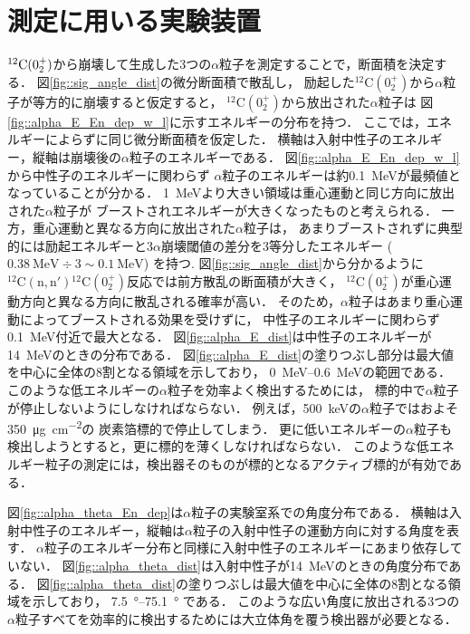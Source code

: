 \documentclass[../master]{subfiles}
\begin{document}
\section{測定に用いる実験装置}
\label{seq::detector_using_experiment}
${}^{12}{\rm C} (0_2^+)$から崩壊して生成した3つの$\alpha$粒子を測定することで，断面積を決定する．
図\ref{fig::sig_angle_dist}の微分断面積で散乱し，
励起した${}^{12}\mathrm{C}(0_2^+)$から$\alpha$粒子が等方的に崩壊すると仮定すると，
${}^{12}\mathrm{C} (0_2^+)$から放出された$\alpha$粒子は
図\ref{fig::alpha_E_En_dep_w_l}に示すエネルギーの分布を持つ．
ここでは，エネルギーによらずに同じ微分断面積を仮定した．
横軸は入射中性子のエネルギー，縦軸は崩壊後の$\alpha$粒子のエネルギーである．
図\ref{fig::alpha_E_En_dep_w_l}から中性子のエネルギーに関わらず
$\alpha$粒子のエネルギーは約\SI{0.1}{\mega\electronvolt}が最頻値となっていることが分かる．
\SI{1}{\mega\electronvolt}より大きい領域は重心運動と同じ方向に放出された$\alpha$粒子が
ブーストされエネルギーが大きくなったものと考えられる．
一方，重心運動と異なる方向に放出された$\alpha$粒子は，
あまりブーストされずに典型的には励起エネルギーと3$\alpha$崩壊閾値の差分を3等分したエネルギー
($\SI{0.38}{\mega\electronvolt}\div 3 \sim \SI{0.1}{\mega\electronvolt}$) を持つ.
図\ref{fig::sig_angle_dist}から分かるように
${}^{12}\mathrm{C}(\mathrm{n},\mathrm{n}'){}^{12}\mathrm{C}(0_2^+)$反応では前方散乱の断面積が大きく，
${}^{12}\mathrm{C} (0_2^+)$が重心運動方向と異なる方向に散乱される確率が高い．
そのため，$\alpha$粒子はあまり重心運動によってブーストされる効果を受けずに，
中性子のエネルギーに関わらず\SI{0.1}{\mega\electronvolt}付近で最大となる．
図\ref{fig::alpha_E_dist}は中性子のエネルギーが\SI{14}{\mega\electronvolt}のときの分布である．
図\ref{fig::alpha_E_dist}の塗りつぶし部分は最大値を中心に全体の8割となる領域を示しており，
\SIrange{0}{0.6}{\mega\electronvolt}の範囲である．
このような低エネルギーの$\alpha$粒子を効率よく検出するためには，
標的中で$\alpha$粒子が停止しないようにしなければならない．
例えば，\SI{500}{\kilo\electronvolt}の$\alpha$粒子ではおよそ\SI{350}{\micro\gram\per\square\centi\metre}の
炭素箔標的で停止してしまう．
更に低いエネルギーの$\alpha$粒子も検出しようとすると，更に標的を薄くしなければならない．
このような低エネルギー粒子の測定には，検出器そのものが標的となるアクティブ標的が有効である．

図\ref{fig::alpha_theta_En_dep}は$\alpha$粒子の実験室系での角度分布である．
横軸は入射中性子のエネルギー，縦軸は$\alpha$粒子の入射中性子の運動方向に対する角度を表す．
$\alpha$粒子のエネルギー分布と同様に入射中性子のエネルギーにあまり依存していない．
図\ref{fig::alpha_theta_dist}は入射中性子が\SI{14}{\mega\electronvolt}のときの角度分布である．
図\ref{fig::alpha_theta_dist}の塗りつぶしは最大値を中心に全体の8割となる領域を示しており，
\SIrange{7.5}{75.1}{\degree} である．
このような広い角度に放出される3つの$\alpha$粒子すべてを効率的に検出するためには大立体角を覆う検出器が必要となる．
\end{document}
